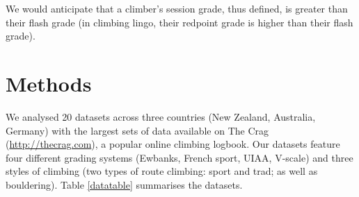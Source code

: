 \documentclass{article}
\begin{document}
We would anticipate that a climber's session grade, thus defined, is greater than their flash grade (in climbing lingo, their redpoint grade is higher than their flash grade). 

%
%
%
%
%
%

\section*{Methods}

We analysed 20 datasets across three countries (New Zealand, Australia, Germany) with the largest sets of data available on The Crag (\url{http://thecrag.com}), a popular online climbing logbook.  Our datasets feature four different grading systems (Ewbanks, French sport, UIAA, V-scale) and three styles of climbing (two types of route climbing: sport and trad; as well as bouldering). Table \ref{datatable} summarises the datasets.
\end{document}
